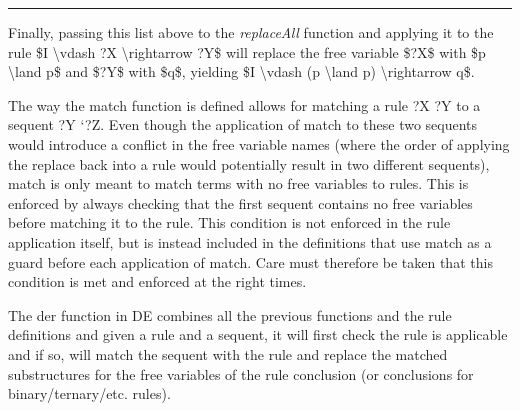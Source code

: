 \documentclass[]{article}
\begin{document}
\begin{center}\rule{3in}{0.4pt}\end{center}

Finally, passing this list above to the \emph{replaceAll} function and
applying it to the rule \$I \textbackslash{}vdash ?X
\textbackslash{}rightarrow ?Y\$ will replace the free variable \$?X\$
with \$p \textbackslash{}land p\$ and \$?Y\$ with \$q\$, yielding \$I
\textbackslash{}vdash (p \textbackslash{}land p)
\textbackslash{}rightarrow q\$.

The way the match function is defined allows for matching a rule ?X ?Y
to a sequent ?Y `?Z. Even though the application of match to these two
sequents would introduce a conflict in the free variable names (where
the order of applying the replace back into a rule would potentially
result in two different sequents), match is only meant to match terms
with no free variables to rules. This is enforced by always checking
that the first sequent contains no free variables before matching it to
the rule. This condition is not enforced in the rule application itself,
but is instead included in the definitions that use match as a guard
before each application of match. Care must therefore be taken that this
condition is met and enforced at the right times.

The der function in DE combines all the previous functions and the rule
definitions and given a rule and a sequent, it will first check the rule
is applicable and if so, will match the sequent with the rule and
replace the matched substructures for the free variables of the rule
conclusion (or conclusions for binary/ternary/etc. rules).
\end{document}
